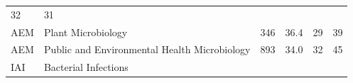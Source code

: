 \documentclass[11pt,]{article}
\begin{document}
\begin{longtable}[]{@{}llrrrr@{}}
\begin{minipage}[t]{0.11\columnwidth}
32\strut
\end{minipage} & \begin{minipage}[t]{0.11\columnwidth}\raggedleft\strut
31\strut
\end{minipage}\tabularnewline
\begin{minipage}[t]{0.06\columnwidth}\raggedright\strut
AEM\strut
\end{minipage} & \begin{minipage}[t]{0.43\columnwidth}\raggedright\strut
Plant Microbiology\strut
\end{minipage} & \begin{minipage}[t]{0.04\columnwidth}\raggedleft\strut
346\strut
\end{minipage} & \begin{minipage}[t]{0.08\columnwidth}\raggedleft\strut
36.4\strut
\end{minipage} & \begin{minipage}[t]{0.11\columnwidth}\raggedleft\strut
29\strut
\end{minipage} & \begin{minipage}[t]{0.11\columnwidth}\raggedleft\strut
39\strut
\end{minipage}\tabularnewline
\begin{minipage}[t]{0.06\columnwidth}\raggedright\strut
AEM\strut
\end{minipage} & \begin{minipage}[t]{0.43\columnwidth}\raggedright\strut
Public and Environmental Health Microbiology\strut
\end{minipage} & \begin{minipage}[t]{0.04\columnwidth}\raggedleft\strut
893\strut
\end{minipage} & \begin{minipage}[t]{0.08\columnwidth}\raggedleft\strut
34.0\strut
\end{minipage} & \begin{minipage}[t]{0.11\columnwidth}\raggedleft\strut
32\strut
\end{minipage} & \begin{minipage}[t]{0.11\columnwidth}\raggedleft\strut
45\strut
\end{minipage}\tabularnewline
\begin{minipage}[t]{0.06\columnwidth}\raggedright\strut
IAI\strut
\end{minipage} & \begin{minipage}[t]{0.43\columnwidth}\raggedright\strut
Bacterial Infections\strut
\end{minipage} & \begin{minipage}[t]{0.04\columnwidth}\raggedleft\strut

\end{minipage}
\end{longtable}
\end{document}
